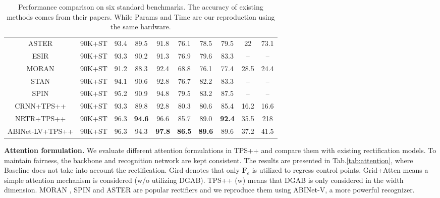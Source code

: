\documentclass{article}
\begin{document}
\begin{table*}[h]
\begin{tabular}{c|c|c|c|c|c|c|c|c|c}
\hline
ASTER\cite{shi2018aster} & 90K+ST  & 93.4 & 89.5 & 91.8 & 76.1 & 78.5 & 79.5 & 22 & 73.1\\
ESIR\cite{zhan2019esir} & 90K+ST  & 93.3  & 90.2 & 91.3 & 76.9 & 79.6 & 83.3 & -- & -- \\
MORAN\cite{cluo2019moran} & 90K+ST & 91.2 & 88.3 & 92.4 & 68.8 & 76.1 & 77.4 & 28.5 & 24.4\\
STAN\cite{lin2021stan} & 90K+ST & 94.1 & 90.6 & 92.8 & 76.7 & 82.2 & 83.3 & -- & --\\
SPIN\cite{zhang2021spin} & 90K+ST & 95.2 & 90.9 & 94.8 & 79.5 & 83.2 & 87.5 & -- & --\\
\hline
CRNN+TPS++ & 90K+ST &  93.3 & 89.8 & 92.8 & 80.3 & 80.6 & 85.4  &  16.2 & 16.6\\ 
NRTR+TPS++ & 90K+ST & 96.3 & \textbf{94.6} & 96.6 & 85.7 & 89.0 & \textbf{92.4} & 35.5 & 218 \\ 
ABINet-LV+TPS++ & 90K+ST & 96.3 & 94.3 & \textbf{97.8} & \textbf{86.5} & \textbf{89.6} & 89.6 & 37.2 & 41.5 \\ 
\hline
\end{tabular}

\caption{Performance comparison on six standard benchmarks. The accuracy of existing methods comes from their papers. While Params and Time are our reproduction using the same hardware.}
\label{tab:sota}
\end{table*}

\noindent\textbf{Attention formulation.}
We evaluate different attention formulations in TPS++ and compare them with existing rectification models. To maintain fairness, the backbone and recognition network are kept consistent. The results are presented in Tab.\ref{tab:attention}, where Baseline does not take into account the rectification. Gird denotes that only $\boldsymbol{F}_{e}$ is utilized to regress control points. Grid+Atten means a simple attention mechanism is considered (w/o utilizing DGAB). TPS++ (w) means that DGAB is only considered in the width dimension. MORAN \cite{cluo2019moran}, SPIN \cite{zhang2021spin} and ASTER \cite{shi2018aster} are popular rectifiers and we reproduce them using ABINet-V, a more powerful recognizer.
\end{document}
